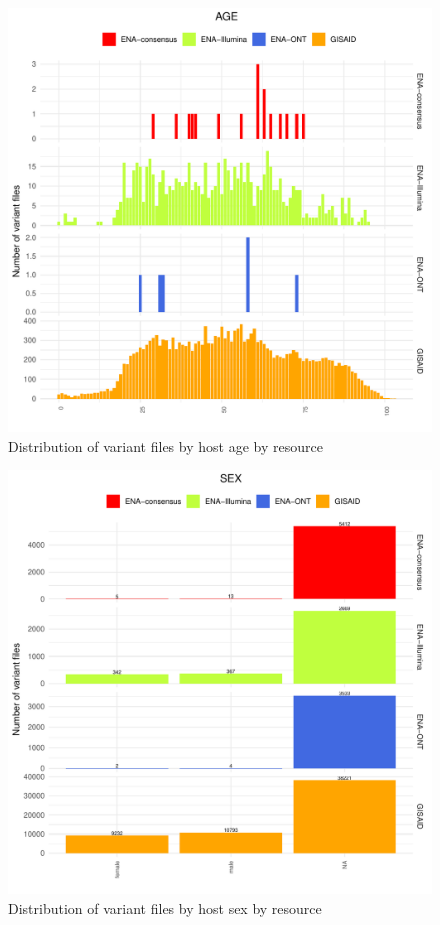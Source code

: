 \documentclass[a4paper, 10pt]{article}        %
\begin{document}
   \begin{figure}[!htb]
     \centering
       \includegraphics[width=1\textwidth]{all_age_res_facet.pdf}
     \caption{Distribution of variant files by host age by resource}
     \label{fig:illu}
 \end{figure}




   \begin{figure}[!htb]
     \centering
       \includegraphics[width=1\textwidth]{all_sex_res_facet.pdf}
     \caption{Distribution of variant files by host sex by resource}
     \label{fig:illu}
 \end{figure}
 
\end{document}
